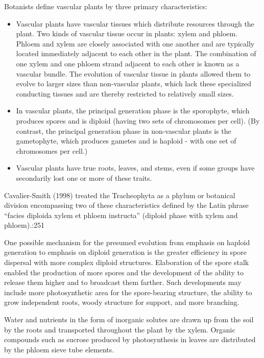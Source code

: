 Botanists define vascular plants by three primary characteristics:

\begin{itemize}
\tightlist
\item
  Vascular plants have vascular tissues which distribute resources through the plant. Two kinds of vascular tissue occur in plants: xylem and phloem. Phloem and xylem are closely associated with one another and are typically located immediately adjacent to each other in the plant. The combination of one xylem and one phloem strand adjacent to each other is known as a vascular bundle. The evolution of vascular tissue in plants allowed them to evolve to larger sizes than non-vascular plants, which lack these specialized conducting tissues and are thereby restricted to relatively small sizes.
\item
  In vascular plants, the principal generation phase is the sporophyte, which produces spores and is diploid (having two sets of chromosomes per cell). (By contrast, the principal generation phase in non-vascular plants is the gametophyte, which produces gametes and is haploid - with one set of chromosomes per cell.)
\item
  Vascular plants have true roots, leaves, and stems, even if some groups have secondarily lost one or more of these traits.
\end{itemize}

Cavalier-Smith (1998) treated the Tracheophyta as a phylum or botanical division encompassing two of these characteristics defined by the Latin phrase ``facies diploida xylem et phloem instructa'' (diploid phase with xylem and phloem).:251

One possible mechanism for the presumed evolution from emphasis on haploid generation to emphasis on diploid generation is the greater efficiency in spore dispersal with more complex diploid structures. Elaboration of the spore stalk enabled the production of more spores and the development of the ability to release them higher and to broadcast them farther. Such developments may include more photosynthetic area for the spore-bearing structure, the ability to grow independent roots, woody structure for support, and more branching.

Water and nutrients in the form of inorganic solutes are drawn up from the soil by the roots and transported throughout the plant by the xylem. Organic compounds such as sucrose produced by photosynthesis in leaves are distributed by the phloem sieve tube elements.

